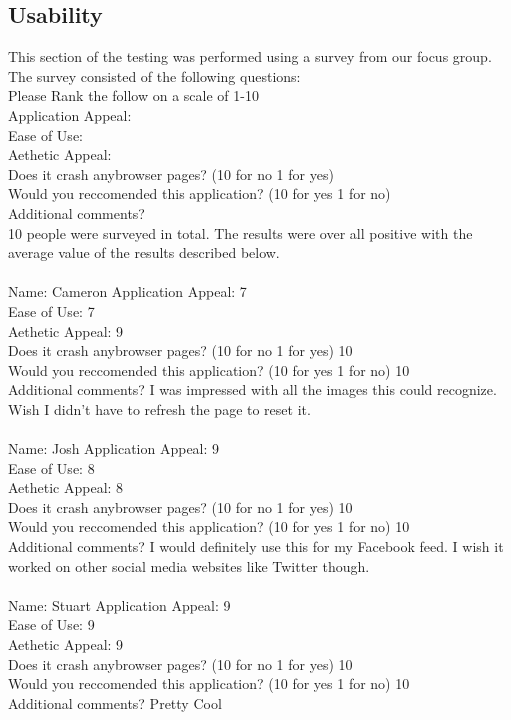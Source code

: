 \documentclass[12pt, titlepage]{article}
\begin{document}
\subsection{Usability}
This section of the testing was performed using a survey from our focus group. The survey consisted of the following questions: \\
Please Rank the follow on a scale of 1-10 \\
Application Appeal:  \\
Ease of Use:\\
Aethetic Appeal: \\
Does it crash anybrowser pages? (10 for no 1 for yes) \\
Would you reccomended this application? (10 for yes 1 for no) \\
Additional comments? \\

10 people were surveyed in total. The results were over all positive with the average value of the results described below.	\\
\\
Name: Cameron
Application Appeal: 7 \\ 
Ease of Use: 7\\ 
Aethetic Appeal: 9\\ 
Does it crash anybrowser pages? (10 for no 1 for yes) 10\\ 
Would you reccomended this application? (10 for yes 1 for no) 10\\ 
Additional comments? I was impressed with all the images this could recognize. Wish I didn't have to refresh the page to reset it.\\

\\
Name: Josh
Application Appeal: 9 \\ 
Ease of Use: 8\\ 
Aethetic Appeal: 8\\ 
Does it crash anybrowser pages? (10 for no 1 for yes) 10\\ 
Would you reccomended this application? (10 for yes 1 for no) 10\\ 
Additional comments? I would definitely use this for my Facebook feed. I wish it worked on other social media websites like Twitter though.\\

\\
Name: Stuart
Application Appeal: 9 \\ 
Ease of Use: 9\\ 
Aethetic Appeal: 9\\ 
Does it crash anybrowser pages? (10 for no 1 for yes) 10\\ 
Would you reccomended this application? (10 for yes 1 for no) 10\\ 
Additional comments? Pretty Cool\\
\end{document}
